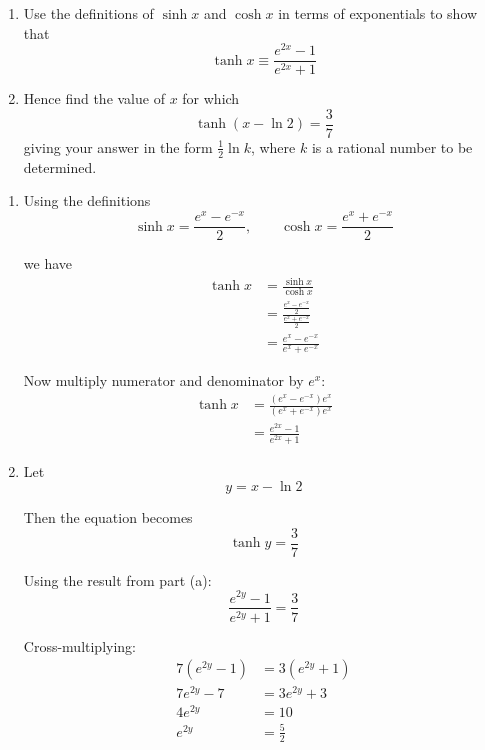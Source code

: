 \documentclass[leqno]{article}
\begin{document}
\begin{enumerate}[
  label=\textbf{\arabic*.},
  leftmargin=*,
  topsep=0pt,
  partopsep=0pt,
  parsep=0pt
]
\begin{djsSolution}
\end{djsSolution}


\newpage

\questionitem

\begin{enumerate}[label=\textbf{(\alph*)}]
  \item Use the definitions of $\sinh x$ and $\cosh x$ in terms of exponentials to show that
  \[
  \tanh x \equiv \frac{e^{2x}-1}{e^{2x}+1}
  \]
  \item Hence find the value of $x$ for which
  \[
  \tanh(x-\ln 2)=\frac{3}{7}
  \]
  giving your answer in the form $\frac{1}{2}\ln k$, where $k$ is a rational number to be determined.  \\
\end{enumerate}

\vspace*{10pt}

\begin{djsSolution}
\begin{enumerate}[label=\textbf{(\alph*)}]
  \item Using the definitions
  \[
  \sinh x=\frac{e^x-e^{-x}}{2},
  \qquad
  \cosh x=\frac{e^x+e^{-x}}{2}
  \]

  we have
  \begin{align*}
  \tanh x
  &=\frac{\sinh x}{\cosh x} \\
  &=\frac{\frac{e^x-e^{-x}}{2}}{\frac{e^x+e^{-x}}{2}} \\
  &=\frac{e^x-e^{-x}}{e^x+e^{-x}}
  \end{align*}

  Now multiply numerator and denominator by $e^x$:
  \begin{align*}
  \tanh x
  &=\frac{(e^x-e^{-x})e^x}{(e^x+e^{-x})e^x} \\
  &=\frac{e^{2x}-1}{e^{2x}+1}
  \end{align*}

  \item Let
  \[
  y=x-\ln 2
  \]

  Then the equation becomes
  \[
  \tanh y=\frac{3}{7}
  \]

  Using the result from part (a):
  \[
  \frac{e^{2y}-1}{e^{2y}+1}=\frac{3}{7}
  \]

  Cross-multiplying:
  \begin{align*}
  7(e^{2y}-1)&=3(e^{2y}+1) \\
  7e^{2y}-7&=3e^{2y}+3 \\
  4e^{2y}&=10 \\
  e^{2y}&=\frac{5}{2}
  \end{align*}


\end{enumerate}
\end{djsSolution}
\end{enumerate}
\end{document}
